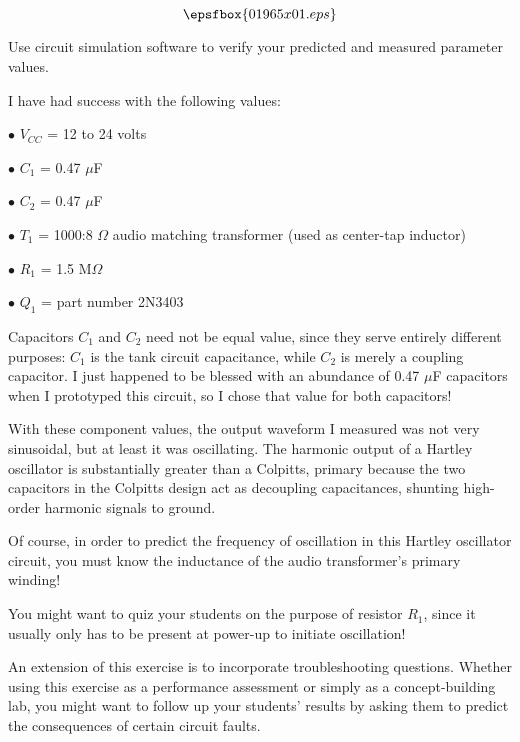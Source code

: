 

$$\epsfbox{01965x01.eps}$$

\vfil \eject






Use circuit simulation software to verify your predicted and measured parameter values.







I have had success with the following values:

\medskip
\item{$\bullet$} $V_{CC}$ = 12 to 24 volts
\item{$\bullet$} $C_1$ = 0.47 $\mu$F
\item{$\bullet$} $C_2$ = 0.47 $\mu$F
\item{$\bullet$} $T_1$ = 1000:8 $\Omega$ audio matching transformer (used as center-tap inductor)
\item{$\bullet$} $R_1$ = 1.5 M$\Omega$
\item{$\bullet$} $Q_1$ = part number 2N3403
\medskip

Capacitors $C_1$ and $C_2$ need not be equal value, since they serve entirely different purposes: $C_1$ is the tank circuit capacitance, while $C_2$ is merely a coupling capacitor.  I just happened to be blessed with an abundance of 0.47 $\mu$F capacitors when I prototyped this circuit, so I chose that value for both capacitors!

With these component values, the output waveform I measured was not very sinusoidal, but at least it was oscillating.  The harmonic output of a Hartley oscillator is substantially greater than a Colpitts, primary because the two capacitors in the Colpitts design act as decoupling capacitances, shunting high-order harmonic signals to ground.  

Of course, in order to predict the frequency of oscillation in this Hartley oscillator circuit, you must know the inductance of the audio transformer's primary winding!

You might want to quiz your students on the purpose of resistor $R_1$, since it usually only has to be present at power-up to initiate oscillation!

An extension of this exercise is to incorporate troubleshooting questions.  Whether using this exercise as a performance assessment or simply as a concept-building lab, you might want to follow up your students' results by asking them to predict the consequences of certain circuit faults.




